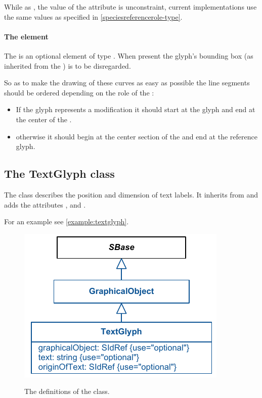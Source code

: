 While as , the value of the  attribute is 
unconstraint, current implementations use the same values as specified 
in \ref{speciesreferencerole-type}. 


\paragraph{The  element}
The  is an optional element of type \Curve. When present 
the glyph's bounding box (as inherited from the \GraphicalObject) is to 
be disregarded. 

So as to make the drawing of these curves as easy as possible the line 
segments should be ordered depending on the role of the \ReferenceGlyph:

\begin{itemize}
	\item If the glyph represents a modification it should start at the glyph and end at the center of the \GeneralGlyph.
	\item otherwise it should begin at the center section of the \GeneralGlyph and end at the reference glyph. 
\end{itemize}


\subsection{The TextGlyph class}
\label{textglyph-class}
The \TextGlyph class describes the position and dimension of text 
labels. It inherits from \GraphicalObject and adds the attributes 
,  and . 


For an example see \ref{example:textglyph}.

\begin{figure}[!h]
\includegraphics{uml/layout-textglyph-uml}\\
\caption{The definitions of the \TextGlyph class.}
\label{uml:textglyph}
\end{figure}

